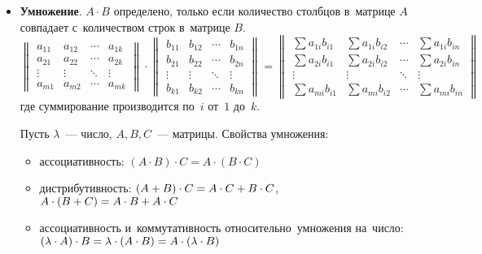 \begin{itemize}
	\item\textbf{Умножение}. $A \cdot B$ определено, только если количество столбцов в~матрице $A$ совпадает с~количеством строк в~матрице $B$.
	\begin{equation*}
	\begin{Vmatrix}
	a_{11} & a_{12} & \cdots & a_{1k} \\ 
	a_{21} & a_{22} & \cdots & a_{2k} \\ 
	\vdots & \vdots & \ddots & \vdots \\ 
	a_{m1} & a_{m2} & \cdots & a_{mk}
	\end{Vmatrix} \cdot
	\begin{Vmatrix}
	b_{11} & b_{12} & \cdots & b_{1n} \\ 
	b_{21} & b_{22} & \cdots & b_{2n} \\ 
	\vdots & \vdots & \ddots & \vdots \\ 
	b_{k1} & b_{k2} & \cdots & b_{kn}
	\end{Vmatrix} =
	\begin{Vmatrix}
	\sum a_{1i}b_{i1} & \sum a_{1i}b_{i2} & \cdots & \sum a_{1i}b_{in} \\
	\sum a_{2i}b_{i1} & \sum a_{2i}b_{i2} & \cdots & \sum a_{2i}b_{in} \\
	\vdots & \vdots & \ddots & \vdots \\
	\sum a_{mi}b_{i1} & \sum a_{mi}b_{i2} & \cdots & \sum a_{mi}b_{in}
	\end{Vmatrix}
	\end{equation*}
	где суммирование производится по~$i$ от~$1$ до~$k$.
	
	Пусть $\lambda$~--- число, $A, B, C$~--- матрицы. Свойства умножения:
	\begin{itemize}
		\item ассоциативность:
		$(A \cdot B) \cdot C = A \cdot (B \cdot C)$
		\item дистрибутивность:
		$(A + B) \cdot C \opbr= A \cdot C + B \cdot C$,
		$A \cdot (B + C) \opbr= A \cdot B + A \cdot C$
		\item ассоциативность и~коммутативность относительно~умножения на~число:
		$(\lambda \cdot A) \cdot B \opbr= \lambda \cdot (A \cdot B) \opbr= A \cdot (\lambda \cdot B)$
	\end{itemize}
\end{itemize}